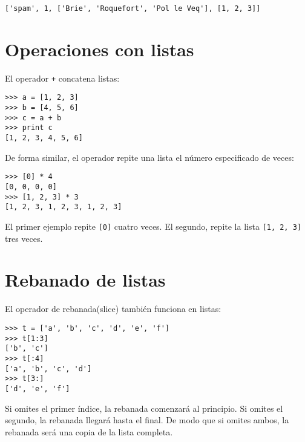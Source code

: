 
\beforeverb
\begin{verbatim}
['spam', 1, ['Brie', 'Roquefort', 'Pol le Veq'], [1, 2, 3]]
\end{verbatim}
\afterverb



\section{Operaciones con listas}

El operador {\tt +} concatena listas:


\beforeverb
\begin{verbatim}
>>> a = [1, 2, 3]
>>> b = [4, 5, 6]
>>> c = a + b
>>> print c
[1, 2, 3, 4, 5, 6]
\end{verbatim}
\afterverb
%
De forma similar, el operador {\tt *} repite una lista el número especificado de veces:


\beforeverb
\begin{verbatim}
>>> [0] * 4
[0, 0, 0, 0]
>>> [1, 2, 3] * 3
[1, 2, 3, 1, 2, 3, 1, 2, 3]
\end{verbatim}
\afterverb
%
El primer ejemplo repite {\tt [0]} cuatro veces. El segundo,
repite la lista {\tt [1, 2, 3]} tres veces.


\section{Rebanado de listas}


El operador de rebanada(slice) también funciona en listas:

\beforeverb
\begin{verbatim}
>>> t = ['a', 'b', 'c', 'd', 'e', 'f']
>>> t[1:3]
['b', 'c']
>>> t[:4]
['a', 'b', 'c', 'd']
>>> t[3:]
['d', 'e', 'f']
\end{verbatim}
\afterverb
%
Si omites el primer índice, la rebanada comenzará al principio.
Si omites el segundo, la rebanada llegará hasta el final. De modo que
si omites ambos, la rebanada será una copia de la lista completa.


